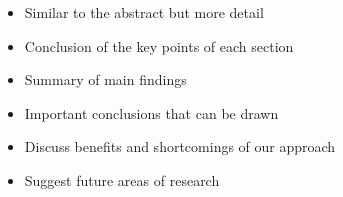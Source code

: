 \documentclass[letterpaper, 10 pt, conference]{ieeeconf}  %
\begin{document}
\begin{itemize}
      \item Similar to the abstract but more detail
      \item Conclusion of the key points of each section
      \item Summary of main findings
      \item Important conclusions that can be drawn
      \item Discuss benefits and shortcomings of our approach
      \item Suggest future areas of research
   \end{itemize}


\addtolength{\textheight}{-12cm}   %


















\newpage





\newpage

\appendices
\end{document}
